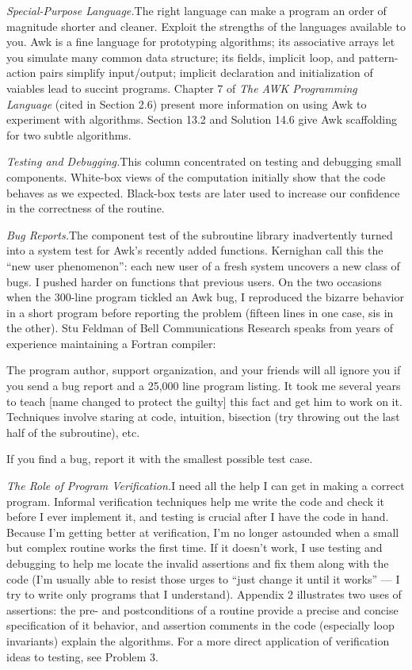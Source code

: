{\it Special-Purpose Language.}\quad The right language can make a program an
order of magnitude shorter and cleaner. Exploit the strengths of the languages
available to you. Awk is a fine language for prototyping algorithms; its
associative arrays let you simulate many common data structure; its fields,
implicit loop, and pattern-action pairs simplify input/output; implicit
declaration and initialization of vaiables lead to succint programs. Chapter 7
of {\sl The AWK Programming Language\/} (cited in Section 2.6) present more
information on using Awk to experiment with algorithms. Section 13.2 and
Solution 14.6 give Awk scaffolding for two subtle algorithms.

{\it Testing and Debugging.}\quad This column concentrated on testing and
debugging small components. White-box views of the computation initially show
that the code behaves as we expected. Black-box tests are later used to
increase our confidence in the correctness of the routine.

{\it Bug Reports.}\quad The component test of the subroutine library
inadvertently turned into a system test for Awk's recently added functions.
Kernighan call this the ``new user phenomenon'': each new user of a fresh
system uncovers a new class of bugs. I pushed harder on functions that previous
users. On the two occasions when the 300-line program tickled an Awk bug, I
reproduced the bizarre behavior in a short program before reporting the problem
(fifteen lines in one case, sis in the other). Stu Feldman of Bell
Communications Research speaks from years of experience maintaining a Fortran
compiler:

{\medskip\more
The program author, support organization, and your friends will all ignore you
if you send a bug report and a 25{,}000 line program listing. It took me several
years to teach [name changed to protect the guilty] this fact and get him to
work on it. Techniques involve staring at code, intuition, bisection (try
throwing out the last half of the subroutine), etc.
\medskip}

\noindent If you find a bug, report it with the smallest possible test case.

{\it The Role of Program Verification.}\quad I need all the help I can get in
making a correct program. Informal verification techniques help me write the
code and check it before I ever implement it, and testing is crucial after I
have the code in hand. Because I'm getting better at verification, I'm no longer
astounded when a small but complex routine works the first time. If it doesn't
work, I use testing and debugging to help me locate the invalid assertions and
fix them along with the code (I'm usually able to resist those urges to ``just
change it until it works'' --- I try to write only programs that I understand).
Appendix 2 illustrates two uses of assertions: the pre- and postconditions of a
routine provide a precise and concise specification of it behavior, and
assertion comments in the code (especially loop invariants) explain the
algorithms. For a more direct application of verification ideas to testing, see
Problem 3.

